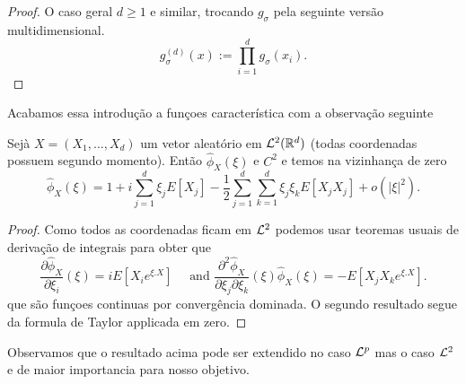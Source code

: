 \begin{proof}
\medskip

O caso geral $d\ge 1$ e similar, trocando $g_{\sigma}$ pela seguinte versão multidimensional.
$$g_{\sigma}^{(d)}(x):=\prod_{i=1}^d g_{\sigma}(x_i).$$
\end{proof}


Acabamos essa introdução a funçoes característica com a observação seguinte

\begin{proposition}\label{prop:taylorcara}
 Sejà $X=(X_1,\dots,X_d)$ um vetor aleatório em ${\mathcal L}^2({\mathbb R}^d)$ (todas coordenadas possuem segundo momento). Então $\hat \phi_X(\xi)$ e $C^2$ e
 temos na vizinhança de zero
 \begin{equation}\label{taylorblabla}
  \hat \phi_X(\xi)=1+i \sum_{j=1}^d \xi_j E[X_j]- \frac{1}{2} \sum_{j=1}^d\sum_{k=1}^d \xi_j \xi_k E[X_j X_j]+ o(|\xi|^2).
 \end{equation}
\end{proposition}

  \begin{proof}
   Como todos as coordenadas ficam em ${\mathcal L}^2$ podemos usar teoremas usuais de derivação de integrais  para obter que
   \begin{equation}
    \frac{\partial  \hat \phi_X}{\partial \xi_i}(\xi)=  iE[X_i e^{\xi.X}] \quad \text{ and }  \frac{\partial^2  \hat \phi_X}{\partial \xi_j \partial \xi_k}(\xi)
    \hat \phi_X(\xi)=-E[X_jX_k e^{\xi.X}].
   \end{equation}
   que são funçoes continuas por convergência dominada.
O segundo resultado segue da formula de Taylor applicada em zero.
  \end{proof}
Observamos que o resultado acima pode ser extendido no caso ${\mathcal L}^p$ mas o caso ${\mathcal L}^2$ e de maior importancia para nosso objetivo.


